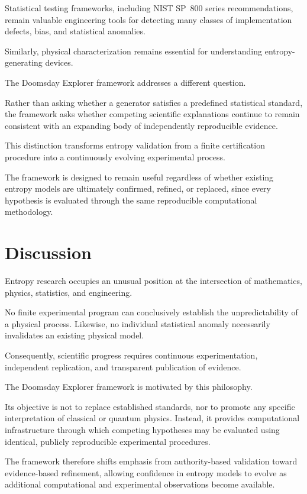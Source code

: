 \documentclass[11pt]{article}
\begin{document}
Statistical testing frameworks,
including NIST SP~800\cite{nist80022} series recommendations,
remain valuable engineering tools for detecting
many classes of implementation defects,
bias,
and statistical anomalies.

Similarly,
physical characterization remains essential
for understanding entropy-generating devices.

The Doomsday Explorer framework addresses a different question.

Rather than asking whether a generator satisfies
a predefined statistical standard,
the framework asks whether competing scientific explanations
continue to remain consistent
with an expanding body of independently reproducible evidence.

This distinction transforms entropy validation
from a finite certification procedure
into a continuously evolving experimental process.

The framework is designed to remain useful regardless of whether existing entropy models are ultimately confirmed, refined, or replaced, since every hypothesis is evaluated through the same reproducible computational methodology.

\section{Discussion}

Entropy research occupies an unusual position
at the intersection of mathematics,
physics,
statistics,
and engineering.

No finite experimental program
can conclusively establish
the unpredictability of a physical process.
Likewise,
no individual statistical anomaly
necessarily invalidates an existing physical model.

Consequently,
scientific progress requires
continuous experimentation,
independent replication,
and transparent publication of evidence.

The Doomsday Explorer framework
is motivated by this philosophy.

Its objective is not to replace established standards,
nor to promote any specific interpretation
of classical or quantum physics.
Instead,
it provides computational infrastructure
through which competing hypotheses
may be evaluated using identical,
publicly reproducible experimental procedures.

The framework therefore shifts emphasis
from authority-based validation
toward evidence-based refinement,
allowing confidence in entropy models
to evolve as additional computational
and experimental observations become available.
\end{document}
